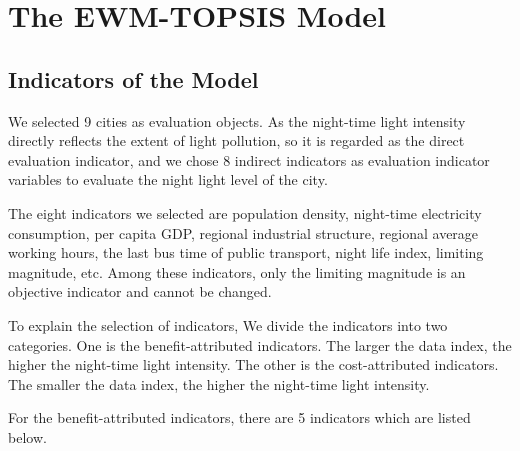 \MinParskip{}

\section{The EWM-TOPSIS Model}

\subsection{Indicators of the Model}
We selected 9 cities as evaluation objects. As the night-time light intensity directly reflects the extent of light pollution, so it is regarded as the direct evaluation indicator, and we chose 8 indirect indicators as evaluation indicator variables to evaluate the night light level of the city.

The eight indicators we selected are population density, night-time electricity consumption, per capita GDP, regional industrial structure, regional average working hours, the last bus time of public transport, night life index, limiting magnitude, etc. Among these indicators, only the limiting magnitude is an objective indicator and cannot be changed.

To explain the selection of indicators, We divide the indicators into two categories. One is the benefit-attributed indicators. The larger the data index, the higher the night-time light intensity. The other is the cost-attributed indicators. The smaller the data index, the higher the night-time light intensity.

For the benefit-attributed indicators, there are 5 indicators which are listed below.

